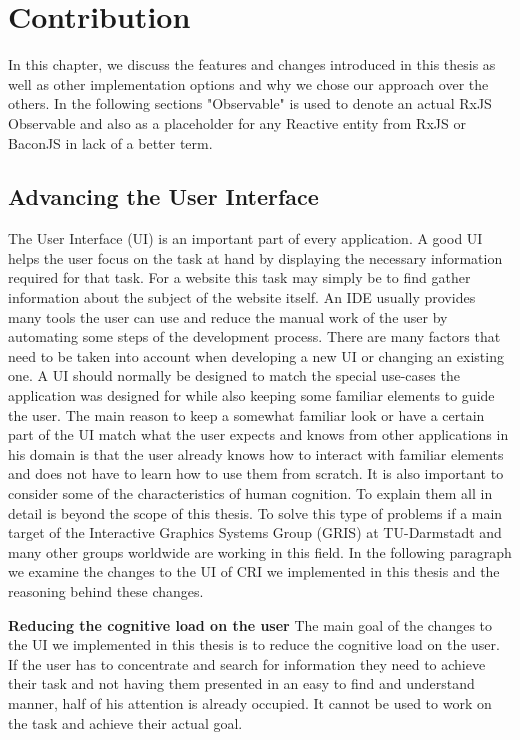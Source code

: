 \chapter{Contribution}
\label{ch:Contribution}
In this chapter, we discuss the features and changes introduced in this thesis as well as other implementation options and why we chose our approach over the others.
In the following sections "Observable" is used to denote an actual RxJS Observable and also as a placeholder for any Reactive entity from RxJS or BaconJS in lack of a better term.

\section{Advancing the User Interface}
The User Interface (UI) is an important part of every application. A good UI helps the user focus on the task at hand by displaying the necessary information required for that task. For a website this task may simply be to find gather information about the subject of the website itself. An IDE usually provides many tools the user can use and reduce the manual work of the user by automating some steps of the development process. There are many factors that need to be taken into account when developing a new UI or changing an existing one. A UI should normally be designed to match the special use-cases the application was designed for while also keeping some familiar elements to guide the user. The main reason to keep a somewhat familiar look or have a certain part of the UI match what the user expects and knows from other applications in his domain is that the user already knows how to interact with familiar elements and does not have to learn how to use them from scratch. It is also important to consider some of the characteristics of human cognition. To explain them all in detail is beyond the scope of this thesis. To solve this type of problems if a main target of the Interactive Graphics Systems Group (GRIS) at TU-Darmstadt and many other groups worldwide are working in this field. In the following paragraph we examine the changes to the UI of CRI we implemented in this thesis and the reasoning behind these changes.
  
\textbf{Reducing the cognitive load on the user}
The main goal of the changes to the UI we implemented in this thesis is to reduce the cognitive load on the user. If the user has to concentrate and search for information they need to achieve their task and not having them presented in an easy to find and understand manner, half of his attention is already occupied. It cannot be used to work on the task and achieve their actual goal.

